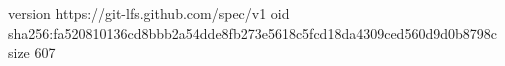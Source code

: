 version https://git-lfs.github.com/spec/v1
oid sha256:fa520810136cd8bbb2a54dde8fb273e5618c5fcd18da4309ced560d9d0b8798c
size 607
